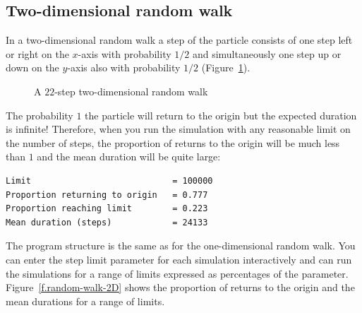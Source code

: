 \subsection{Two-dimensional random walk}

In a two-dimensional random walk a step of the particle consists of one step left or right on the $x$-axis with probability $1/2$ and simultaneously one step up or down on the $y$-axis also with probability $1/2$ (Figure~\ref{f.2d-random-walk}).

\begin{figure}
\begin{center}
\end{center}
\caption{A $22$-step two-dimensional random walk}\label{f.2d-random-walk}
\end{figure}
The probability $1$ the particle will return to the origin but the expected duration is infinite! Therefore, when you run the simulation with any reasonable limit on the number of steps, the proportion of returns to the origin will be much less than $1$ and the mean duration will be quite large:
\begin{verbatim}
Limit                            = 100000
Proportion returning to origin   = 0.777
Proportion reaching limit        = 0.223
Mean duration (steps)            = 24133
\end{verbatim}

The program structure is the same as for the one-dimensional random walk. You can enter the step limit parameter for each simulation interactively and can run the simulations for a range of limits expressed as percentages of the parameter. Figure~\ref{f.random-walk-2D} shows the proportion of returns to the origin and the mean durations for a range of limits.

